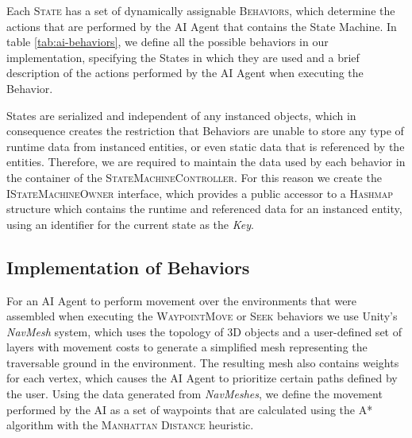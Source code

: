 

Each \textsc{State} has a set of dynamically assignable \textsc{Behaviors}, which determine the actions that are performed by the AI Agent that contains the State Machine. In table \ref{tab:ai-behaviors}, we define all the possible behaviors in our implementation, specifying the States in which they are used and a brief description of the actions performed by the AI Agent when executing the Behavior.



States are serialized and independent of any instanced objects, which in consequence creates the restriction that Behaviors are unable to store any type of runtime data from instanced entities, or even static data that is referenced by the entities. Therefore, we are required to maintain the data used by each behavior in the container of the \textsc{StateMachineController}. For this reason we create the \textsc{IStateMachineOwner} interface, which provides a public accessor to a \textsc{Hashmap} structure which contains the runtime and referenced data for an instanced entity, using an identifier for the current state as the \emph{Key}.


\subsection{Implementation of Behaviors}

For an AI Agent to perform movement over the environments that were assembled when executing the \textsc{WaypointMove} or \textsc{Seek} behaviors we use Unity's \emph{NavMesh} system, which uses the topology of 3D objects and a user-defined set of layers with movement costs to generate a simplified mesh representing the traversable ground in the environment. The resulting mesh also contains weights for each vertex, which causes the AI Agent to prioritize certain paths defined by the user. Using the data generated from \emph{NavMeshes}, we define the movement performed by the AI as a set of waypoints that are calculated using the \textsc{A*} algorithm with the \textsc{Manhattan Distance} heuristic.

